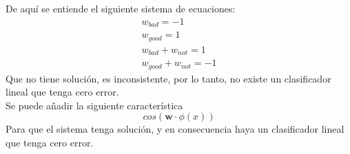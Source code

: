 \documentclass[14pt,a4paper]{report}
\begin{document}
De aquí se entiende el siguiente sistema de ecuaciones:
\begin{equation*}
\begin{array}{c}
w_{bad}=-1\\
w_{good}=1\\
w_{bad}+w_{not}=1\\
w_{good}+w_{not}=-1
\end{array}
\end{equation*}
Que no tiene solución, es inconsistente, por lo tanto, no existe un clasificador lineal que tenga cero error.\\
Se puede añadir la siguiente característica\\
\begin{equation*}
	cos(\mathbf{w}\cdot\phi(x))
\end{equation*}
Para que el sistema tenga solución, y en consecuencia haya un clasificador lineal que tenga cero error.
\end{document}
